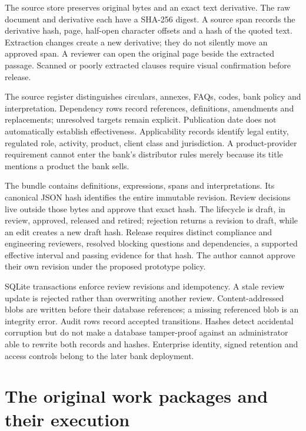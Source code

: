 \documentclass[12pt,a4paper,oneside,openany]{book}
\begin{document}
The source store preserves original bytes and an exact text derivative. The raw
document and derivative each have a SHA-256 digest. A source span records the
derivative hash, page, half-open character offsets and a hash of the quoted text.
Extraction changes create a new derivative; they do not silently move an approved
span. A reviewer can open the original page beside the extracted passage.
Scanned or poorly extracted clauses require visual confirmation before release.

The source register distinguishes circulars, annexes, FAQs, codes, bank policy
and interpretation. Dependency rows record references, definitions, amendments
and replacements; unresolved targets remain explicit. Publication date does not
automatically establish effectiveness. Applicability records identify legal
entity, regulated role, activity, product, client class and jurisdiction. A
product-provider requirement cannot enter the bank's distributor rules merely
because its title mentions a product the bank sells.

The bundle contains definitions, expressions, spans and interpretations. Its
canonical JSON hash identifies the entire immutable revision. Review decisions
live outside those bytes and approve that exact hash. The lifecycle is draft,
in review, approved, released and retired; rejection returns a revision to draft,
while an edit creates a new draft hash. Release requires distinct compliance and
engineering reviewers, resolved blocking questions and dependencies, a supported
effective interval and passing evidence for that hash. The author cannot approve
their own revision under the proposed prototype policy.

SQLite transactions enforce review revisions and idempotency. A stale review
update is rejected rather than overwriting another review. Content-addressed
blobs are written before their database references; a missing referenced blob
is an integrity error. Audit rows record accepted transitions. Hashes detect
accidental corruption but do not make a database tamper-proof against an
administrator able to rewrite both records and hashes. Enterprise identity,
signed retention and access controls belong to the later bank deployment.

\section{The original work packages and their execution}
\end{document}
